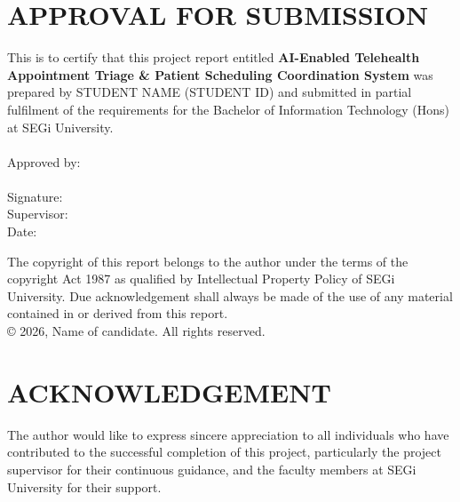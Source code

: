 \documentclass[12pt,a4paper]{report}
\begin{document}
\chapter*{APPROVAL FOR SUBMISSION}
This is to certify that this project report entitled \textbf{AI-Enabled Telehealth Appointment Triage \& Patient Scheduling Coordination System} was prepared by STUDENT NAME (STUDENT ID) and submitted in partial fulfilment of the requirements for the Bachelor of Information Technology (Hons) at SEGi University. \\
\vspace{2cm} \\
Approved by: \\
\vspace{1cm} \\
Signature: \hrulefill \\
Supervisor: \hrulefill \\
Date: \hrulefill \\

\vspace{3cm}
\begin{center}
The copyright of this report belongs to the author under the terms of the copyright Act 1987 as qualified by Intellectual Property Policy of SEGi University. Due acknowledgement shall always be made of the use of any material contained in or derived from this report. \\
© 2026, Name of candidate. All rights reserved.
\end{center}

\chapter*{ACKNOWLEDGEMENT}
The author would like to express sincere appreciation to all individuals who have contributed to the successful completion of this project, particularly the project supervisor for their continuous guidance, and the faculty members at SEGi University for their support.
\end{document}
